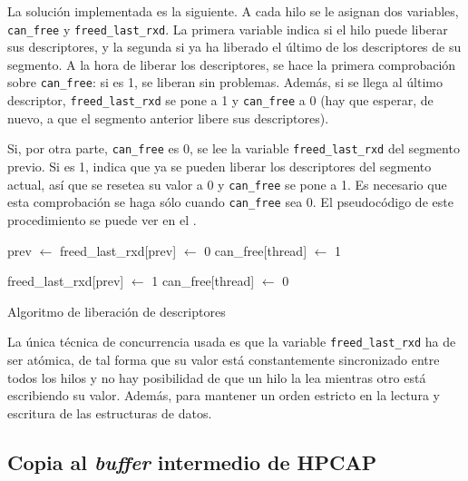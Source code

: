 \documentclass[oneside, draft]{epstfg}
\begin{document}
La solución implementada es la siguiente. A cada hilo se le asignan dos variables, \texttt{can\_free} y \texttt{freed\_last\_rxd}. La primera variable indica si el hilo puede liberar sus descriptores, y la segunda si ya ha liberado el último de los descriptores de su segmento. A la hora de liberar los descriptores, se hace la primera comprobación sobre \texttt{can\_free}: si es 1, se liberan sin problemas. Además, si se llega al último descriptor, \texttt{freed\_last\_rxd} se pone a 1 y \texttt{can\_free} a 0 (hay que esperar, de nuevo, a que el segmento anterior libere sus descriptores).

Si, por otra parte, \texttt{can\_free} es 0, se lee la variable \texttt{freed\_last\_rxd} del segmento previo. Si es 1, indica que ya se pueden liberar los descriptores del segmento actual, así que se resetea su valor a 0 y \texttt{can\_free} se pone a 1. Es necesario que esta comprobación se haga sólo cuando \texttt{can\_free} sea 0. El pseudocódigo de este procedimiento se puede ver en el .

\begin{algorithm}[hbtp]
\begin{algorithmic}
\State prev $\gets$ 
		\State freed\_last\_rxd[prev] $\gets$ 0
		\State can\_free[thread] $\gets$ 1
		\State {}
	\EndIf

		\State {}

			\State {}
			\State freed\_last\_rxd[prev] $\gets$ 1
			\State can\_free[thread] $\gets$ 0
		\EndIf
	\EndIf
\EndFunction
\end{algorithmic}
\caption{Algoritmo de liberación de descriptores}
\label{lst:AlgoritmoDescriptores}
\end{algorithm}

La única técnica de concurrencia usada es que la variable \texttt{freed\_last\_rxd} ha de ser atómica, de tal forma que su valor está constantemente sincronizado entre todos los hilos y no hay posibilidad de que un hilo la lea mientras otro está escribiendo su valor. Además, para mantener un orden estricto en la lectura y escritura de las estructuras de datos.

\subsection{Copia al \textit{buffer} intermedio de HPCAP}
\end{document}
